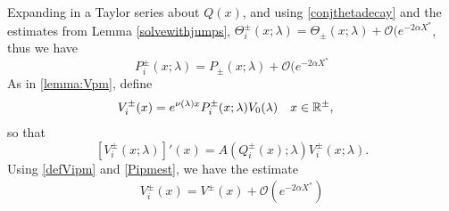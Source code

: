 \documentclass[thesis.tex]{subfiles}
\begin{document}
Expanding in a Taylor series about $Q(x)$, and using \cref{conjthetadecay} and the estimates from Lemma \ref{solvewithjumps}, $\Theta_i^\pm(x; \lambda) = \Theta_\pm(x; \lambda) + \mathcal{O}(e^{-2 \alpha X^*}$, thus we have
\begin{equation}\label{Pipmest}
P_i^\pm(x; \lambda) = P_\pm(x; \lambda) + \mathcal{O}(e^{-2 \alpha X^*}
\end{equation}
As in \cref{lemma:Vpm}, define
\begin{align}\label{defVipm}
V_i^\pm(x) &= e^{\nu(\lambda)x} P_i^\pm(x; \lambda)V_0(\lambda) && x \in \mathbb{R}^\pm,
\end{align}
so that
\begin{equation}\label{PDEeigcenter}
[V_i^\pm(x; \lambda)]'(x) = A(Q_i^\pm(x); \lambda) V_i^\pm(x; \lambda).
\end{equation}
Using \cref{defVipm} and \cref{Pipmest}, we have the estimate
\begin{align}\label{Vipmest}
V_i^\pm(x) = V^\pm(x) + \mathcal{O}(e^{-2 \alpha X^*})
\end{align}
\end{document}
